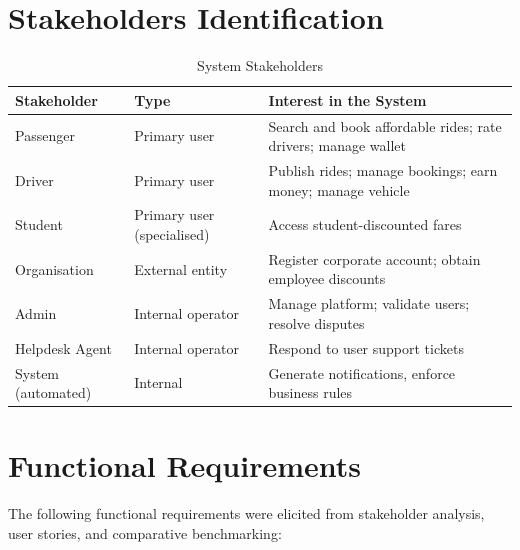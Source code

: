 \documentclass[12pt,a4paper,openright]{report}
\begin{document}
\section{Stakeholders Identification}

\begin{table}[H]
\centering
\caption{System Stakeholders}
\label{tab:stakeholders}
\begin{tabularx}{\textwidth}{l l X}
\toprule
\textbf{Stakeholder} & \textbf{Type} & \textbf{Interest in the System} \\
\midrule
Passenger & Primary user & Search and book affordable rides; rate drivers; manage wallet \\
Driver & Primary user & Publish rides; manage bookings; earn money; manage vehicle \\
Student & Primary user (specialised) & Access student-discounted fares \\
Organisation & External entity & Register corporate account; obtain employee discounts \\
Admin & Internal operator & Manage platform; validate users; resolve disputes \\
Helpdesk Agent & Internal operator & Respond to user support tickets \\
System (automated) & Internal & Generate notifications, enforce business rules \\
\bottomrule
\end{tabularx}
\end{table}

\section{Functional Requirements}

The following functional requirements were elicited from stakeholder analysis, user stories, and comparative benchmarking:
\end{document}
